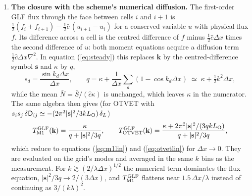 \documentclass[11pt]{article}
\newcommand{\chat}{\hat{c}}
\newcommand{\dx}{\Delta x}
\begin{document}
\begin{enumerate}
For OTVET the tensor is not a function of the local state but of the source field,
$\mathsf D_{ij}(\mathbf x)=\sum_sL_s\hat n_i\hat n_j/r_s^2\,\big/\sum_sL_s/r_s^2$, and its perturbation
$\delta\mathsf D$ enters equation (\ref{eq:steady}) at first order through
$ik_j\,\delta\mathsf D_{ij}\bar N$. With $L_{\rm O}\equiv\int d^3r/r^2$ over the minimum-image cube
($=7.66\,L$),
\begin{equation}
\delta\mathsf D_{ij}(\mathbf k)=\frac{\delta_L(\mathbf k)}{L_{\rm O}}\int\!d^3r\,
\frac{\hat n_i\hat n_j-\delta_{ij}/3}{r^2}\,e^{-i\mathbf k\cdot\mathbf r}
=-\frac{\pi^2}{kL_{\rm O}}\left(\hat k_i\hat k_j-\frac{\delta_{ij}}{3}\right)\delta_L(\mathbf k),
\end{equation}
using $\int_0^\infty j_2(x)\,dx=\pi/4$ (the integral is taken to infinity, which holds for $kL\gg1$). Then
$k_ik_j\,\delta\mathsf D_{ij}=-(2\pi^2k/3L_{\rm O})\,\delta_L$ and
\begin{equation}
T_{\rm OTVET}(k)=\frac{1+2\pi^2k\lambda^2/(3L_{\rm O})}{1+k^2\lambda^2/3},\qquad L_{\rm O}=7.66\,L
\label{eq:otvetlin}
\end{equation}
\citep[eqs.~5.14--5.15 without the opacity response]{wu21}. The extra term is $0.86\,(k\lambda)(\lambda/L)$:
OTVET has too much structure when the mean free path approaches the box size, and for $k\lambda\gg1$ it
tends to $2\pi^2/(kL_{\rm O})$, which does not depend on $\lambda$.
\item \textbf{The closure with the scheme's numerical diffusion.} The first-order GLF flux through the
face between cells $i$ and $i+1$ is $\tfrac12(f_i+f_{i+1})-\tfrac12\chat\,(u_{i+1}-u_i)$ for a conserved
variable $u$ with physical flux $f$. Its difference across a cell is the centred difference of $f$ minus
$\tfrac12\chat\dx$ times the second difference of $u$: both moment equations acquire a diffusion term
$\tfrac12\chat\dx\nabla^2$. In equation (\ref{eq:steady}) this replaces $\mathbf k$ by the centred-difference
symbol $\mathbf s$ and $\kappa$ by $q$,
\begin{equation}
s_d=\frac{\sin k_d\dx}{\dx},\qquad
q=\kappa+\frac{1}{\dx}\sum_d(1-\cos k_d\dx)\;\simeq\;\kappa+\tfrac12k^2\dx,
\end{equation}
while the mean $\bar N=\bar S/(\chat\kappa)$ is unchanged, which leaves $\kappa$ in the numerator. The same
algebra then gives (for OTVET with $s_is_j\,\delta\mathsf D_{ij}\simeq-(2\pi^2|\mathbf s|^2/3kL_{\rm O})\,\delta_L$)
\begin{equation}
T^{\rm GLF}_{\rm M1}(\mathbf k)=\frac{\kappa}{q+|\mathbf s|^2/3q},\qquad
T^{\rm GLF}_{\rm OTVET}(\mathbf k)=\frac{\kappa+2\pi^2|\mathbf s|^2/(3qkL_{\rm O})}{q+|\mathbf s|^2/3q},
\label{eq:glf}
\end{equation}
which reduce to equations (\ref{eq:m1lin}) and (\ref{eq:otvetlin}) for $\dx\to0$. They are evaluated on
the grid's modes and averaged in the same $k$ bins as the measurement. For
$k\gtrsim(2/\lambda\dx)^{1/2}$ the numerical term dominates the flux equation, $|\mathbf s|^2/3q\to2/(3\dx)$,
and $T^{\rm GLF}_{\rm M1}$ flattens near $1.5\,\dx/\lambda$ instead of continuing as $3/(k\lambda)^2$.


\end{enumerate}
\end{document}
